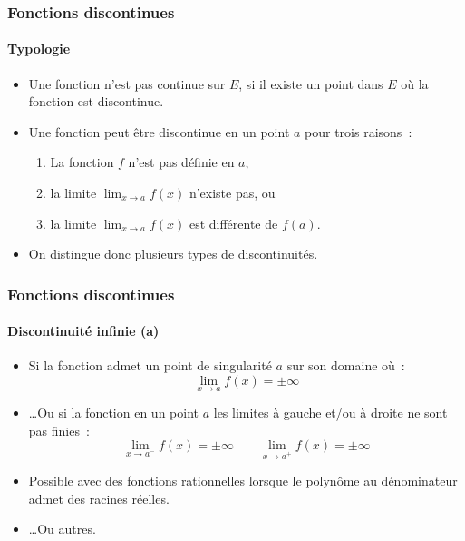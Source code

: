 \documentclass[10pt,notheorems]{beamer}
\theoremstyle{plain}
\theoremstyle{definition} %
\begin{document}
\begin{frame}
  \frametitle{Fonctions discontinues}
  \framesubtitle{Typologie}

  \begin{itemize}

  \item Une fonction n'est pas continue sur $E$, si il existe un point dans $E$ où la fonction est discontinue.\newline

  \item Une fonction peut être discontinue en un point $a$ pour trois raisons~:\newline

    \begin{enumerate}
    \item La fonction $f$ n'est pas définie en $a$,
      \medskip
    \item la limite $\lim_{x \rightarrow a}f(x)$ n'existe pas, ou
      \medskip
    \item la limite $\lim_{x \rightarrow a}f(x)$ est différente de $f(a)$.\newline
    \end{enumerate}

  \item On distingue donc plusieurs types de discontinuités.
  \end{itemize}

\end{frame}


\begin{frame}
  \frametitle{Fonctions discontinues}
  \framesubtitle{Discontinuité infinie (a)}

  \begin{itemize}

  \item Si la fonction admet un point de singularité $a$ sur son domaine où~:
    \[
      \lim_{x\rightarrow a}f(x) = \pm \infty
    \]
    \bigskip

  \item \ldots Ou si la fonction en un point $a$ les limites à gauche et/ou à droite ne sont pas finies~:
    \[
      \lim_{x\rightarrow a^-}f(x) = \pm \infty \quad\quad \lim_{x\rightarrow a^+}f(x) = \pm \infty
    \]
    \bigskip

  \item Possible avec des fonctions rationnelles lorsque le polynôme au dénominateur admet des racines réelles.\newline

  \item \ldots Ou autres.

  \end{itemize}

\end{frame}
\end{document}
